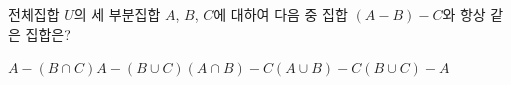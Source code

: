 전체집합 $U$의 세 부분집합 $A$, $B$, $C$에 대하여 다음 중 집합 $(A-B)-C$와 항상 같은 집합은?
\begin{choicesii}{$A-(B\cap C)$}{$A-(B\cup C)$}{$(A\cap B)-C$}{$(A\cup B)-C$}{$(B\cup C)-A$}\end{choicesii}
